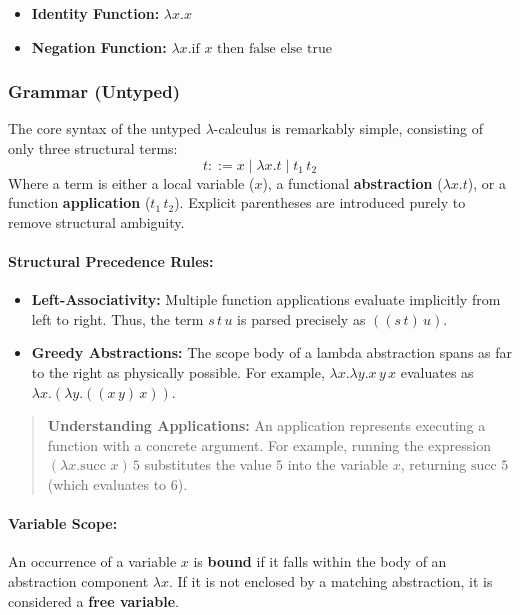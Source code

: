 \documentclass{article}
\begin{document}
\begin{itemize}
  \item \textbf{Identity Function:} $\lambda x . x$
  \item \textbf{Negation Function:} $\lambda x . \text{if } x \text{ then false else true}$
\end{itemize}

\subsubsection{Grammar (Untyped)}
The core syntax of the untyped $\lambda$-calculus is remarkably simple, consisting of only three structural terms:
\[
t ::= x \mid \lambda x . t \mid t_1 \, t_2
\]
Where a term is either a local variable ($x$), a functional \textbf{abstraction} ($\lambda x . t$), or a function \textbf{application} ($t_1 \, t_2$). Explicit parentheses are introduced purely to remove structural ambiguity.

\paragraph{Structural Precedence Rules:}
\begin{itemize}
  \item \textbf{Left-Associativity:} Multiple function applications evaluate implicitly from left to right. Thus, the term $s \, t \, u$ is parsed precisely as $((s \, t) \, u)$.
  \item \textbf{Greedy Abstractions:} The scope body of a lambda abstraction spans as far to the right as physically possible. For example, $\lambda x . \lambda y . x \, y \, x$ evaluates as $\lambda x . (\lambda y . ((x \, y) \, x))$.
\end{itemize}

\begin{quote}
\textbf{Understanding Applications:} An application represents executing a function with a concrete argument. For example, running the expression $(\lambda x . \text{succ } x) \, 5$ substitutes the value $5$ into the variable $x$, returning $\text{succ } 5$ (which evaluates to $6$).
\end{quote}

\paragraph{Variable Scope:} An occurrence of a variable $x$ is \textbf{bound} if it falls within the body of an abstraction component $\lambda x$. If it is not enclosed by a matching abstraction, it is considered a \textbf{free variable}.
\end{document}
